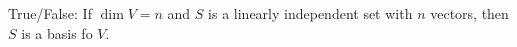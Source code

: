 \documentclass{ximera}
\begin{document}
           \begin{question} True/False: If $\dim V= n$ and $S$ is a linearly independent set with $n$ vectors, then $S$ is a basis fo $V$.\\
           	
           	\begin{multipleChoice}
           	\end{multipleChoice}
           	
           	\end{question}
  
\end{document}

